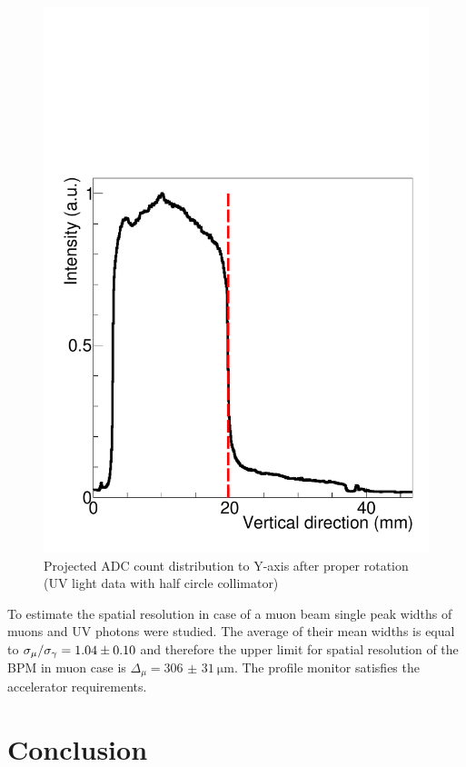 \documentclass[preprint,3p,twocolumn]{elsarticle}
\begin{document}
\begin{figure}[htb]
	\begin{minipage}[t]{60mm}
		\includegraphics[width=1.3\textwidth, height=1.\textwidth]{figure/edge_image_w_uv_4_BH_axis.pdf}
	\end{minipage}
	\caption{ Projected ADC count distribution to Y-axis after proper rotation (UV light data with half circle collimator)}
	\label{fig:half_circle}
\end{figure}

To estimate the spatial resolution in case of a muon beam single peak widths of muons and UV photons were studied.
The average of their mean widths is equal to
$\sigma_{\mu} / \sigma_{\gamma} = \num{1.04 \pm 0.10}$
and therefore the upper limit for spatial resolution of the BPM in muon case is
$\Delta_\mu = \SI{306(31)}{\um}$.
The profile monitor satisfies the accelerator requirements.


\section{Conclusion}
\end{document}
